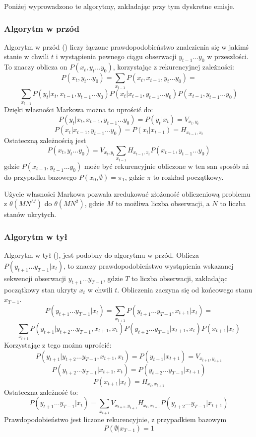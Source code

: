 Poniżej wyprowadzono te algorytmy, zakładając przy tym dyskretne emisje.

\subsubsection{Algorytm w przód}

Algorytm w przód () liczy łączone prawdopodobieństwo znalezienia się w jakimś stanie w chwili $t$
i wystąpienia pewnego ciągu obserwacji $y_{t-1} \dots y_0$ w przeszłości. To znaczy oblicza on $P(x_t, y_t \dots y_0)$, 
korzystając z rekurencyjnej zależności:
$$P(x_t, y_t \dots y_0) = \sum_{x_{t-1}} P(x_t, x_{t-1}, y_t \dots y_0) =$$
$$\sum_{x_{t-1}} P(y_t | x_t, x_{t-1}, y_{t-1} \dots y_0) P(x_t | x_{t-1}, y_{t-1} \dots y_0) P(x_{t-1}, y_{t-1} \dots y_0)$$
Dzięki własności Markowa można to uprościć do:
$$P(y_t | x_t, x_{t-1}, y_{t-1} \dots y_0) = P(y_t | x_t) = V_{x_t, y_t}$$
$$P(x_t | x_{t-1}, y_{t-1} \dots y_0) = P(x_t | x_{t-1}) = H_{x_{t-1}, x_t}$$
Ostateczną zależnością jest
$$P(x_t, y_t \dots y_0) = V_{x_t, y_t} \sum_{x_{t-1}} H_{x_{t-1}, x_t} P(x_{t-1}, y_{t-1} \dots y_0)$$
gdzie $P(x_{t-1}, y_{t-1} \dots y_0)$ może być rekurencyjnie obliczone w ten san sposób aż do przypadku bazowego $P(x_0, \emptyset) = \pi_1$, gdzie $\pi$ to rozkład początkowy.

Użycie własności Markowa pozwala zredukować złożoność obliczeniową problemu z $\theta(MN^M)$ do $\theta(MN^2)$, gdzie $M$ to możliwa liczba obserwacji, a $N$ to liczba stanów ukrytych.

\subsubsection{Algorytm w tył}

Algorytm w tył (), jest podobny do algorytmu w przód. Oblicza $P(y_{t+1} \dots y_{T-1} | x_t)$, to znaczy prawdopodobieństwo wystąpienia wskazanej sekwencji obserwacji $y_{t+1} \dots y_{T-1}$, gdzie $T$ to liczba obserwacji, zakładając początkowy stan ukryty $x_t$ w chwili $t$. Obliczenia zaczyna się od końcowego stanu $x_{T-1}$.
$$P(y_{t+1} \dots y_{T-1} | x_t) = \sum_{x_{t+1}} P(y_{t+1} \dots y_{T-1}, x_{t+1} | x_t) =$$
$$\sum_{x_{t+1}} P(y_{t+1} | y_{t+2} \dots y_{T-1}, x_{t+1}, x_t) P(y_{t+2} \dots y_{T-1} | x_{t+1}, x_t) P(x_{t+1} | x_t)$$
Korzystając z tego można uprościć:
$$P(y_{t+1} | y_{t+2} \dots y_{T-1}, x_{t+1}, x_t) = P(y_{t+1} | x_{t+1}) = V_{x_{t+1},y_{t+1}}$$
$$P(y_{t+2} \dots y_{T-1} | x_{t+1}, x_t) = P(y_{t+2} \dots y_{T-1} | x_{t+1})$$
$$P(x_{t+1} | x_t) = H_{x_t,x_{t+1}}$$
Ostateczna zależność to:
$$P(y_{t+1} \dots y_{T-1} | x_t) =  \sum_{x_{t+1}} V_{x_{t+1},y_{t+1}} H_{x_t,x_{t+1}} P(y_{t+2} \dots y_{T-1} | x_{t+1})$$
Prawdopodobieństwo jest liczone rekurencyjnie, z przypadkiem bazowym
$$P(\emptyset | x_{T-1}) = 1$$

